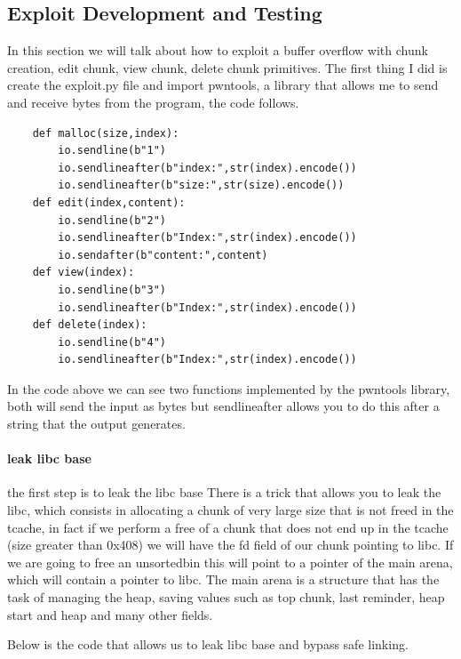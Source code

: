     \subsection{Exploit Development and Testing}
    In this section we will talk about how to exploit a buffer overflow with chunk creation, edit chunk, view chunk, delete chunk primitives.\newline
    The first thing I did is create the exploit.py file and import pwntools, a library that allows me to send and receive bytes from the program, the code follows.
    \begin{verbatim}
    def malloc(size,index):
        io.sendline(b"1")
        io.sendlineafter(b"index:",str(index).encode())
        io.sendlineafter(b"size:",str(size).encode())
    def edit(index,content):
        io.sendline(b"2")
        io.sendlineafter(b"Index:",str(index).encode())
        io.sendafter(b"content:",content)
    def view(index):
        io.sendline(b"3")
        io.sendlineafter(b"Index:",str(index).encode())
    def delete(index):
        io.sendline(b"4")
        io.sendlineafter(b"Index:",str(index).encode())
    \end{verbatim}
    In the code above we can see two functions implemented by the pwntools library, both will send the input as bytes but sendlineafter allows you to do this after a string that the output generates.\newline
    \clearpage
    \paragraph{leak libc base}
    the first step is to leak the libc base \newline
    There is a trick that allows you to leak the libc, which consists in allocating a chunk of very large size that is not freed in the tcache, in fact if we perform a free of a chunk that does not end up in the tcache (size greater than 0x408) we will have the fd field of our chunk pointing to libc.\newline
    If we are going to free an unsortedbin this will point to a pointer of the main arena, which will contain a pointer to libc.\newline
    The main arena is a structure that has the task of managing the heap, saving values such as top chunk, last reminder, heap start and heap and many other fields.\newline

    Below is the code that allows us to leak libc base and bypass safe linking.\newline

